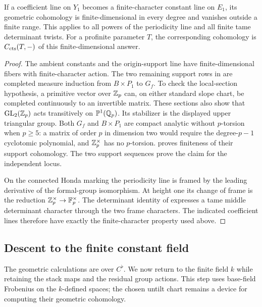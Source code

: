 \begin{corollary}\label{h3:ana:twisted-finiteness}
If a coefficient line on $Y_1$ becomes a finite-character
constant line on $E_1$, its geometric cohomology is
finite-dimensional in every degree and vanishes outside
a finite range.  This applies to all powers of the
periodicity line and all finite tame determinant twists.
For a profinite parameter $T$, the corresponding cohomology
is $C_{\mathrm{cts}}(T,-)$ of this finite-dimensional answer.
\end{corollary}
\begin{proof}
The ambient constants and the origin-support line have
finite-dimensional fibers with finite-character action.
The two remaining support rows in
 are completed measure induction
from $B\times P_1$ to $G_f$.  To check the local-section
hypothesis, a primitive vector over $\mathbb Z_p$ can, on either
standard slope chart, be completed continuously to an
invertible matrix.  These sections also show that
$\operatorname{GL}_2(\mathbb Z_p)$ acts transitively on $\mathbb P^1(\mathbb Q_p)$.
Its stabilizer is the displayed upper triangular group.
Both $G_f$ and $B\times P_1$ are compact analytic without
$p$-torsion when $p\geq5$: a matrix of order $p$ in
dimension two would require the degree-$p-1$ cyclotomic
polynomial, and $\mathbb Z_p^\times$ has no $p$-torsion.
 proves finiteness of their
support cohomology.  The two support sequences prove the
claim for the independent locus.

On the connected Honda marking the periodicity line is
framed by the leading derivative of the formal-group
isomorphism.  At height one its change of frame is
the reduction $\mathbb Z_p^\times\to\mathbb F_p^\times$.  The determinant
identity of  expresses a tame
middle determinant character through the two frame
characters.  The indicated coefficient lines therefore
have exactly the finite-character property used above.
\end{proof}

\subsection{Descent to the finite constant field}

The geometric calculations are over $C^\flat$.  We now return to the
finite field $k$ while retaining the stack maps and the residual group
actions.  This step uses base-field Frobenius on the $k$-defined
spaces; the chosen untilt chart remains a device for computing their
geometric cohomology.


